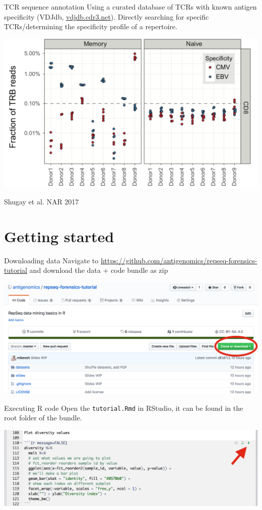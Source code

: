 \documentclass[12pt]{beamer}
\begin{document}
\begin{frame}{TCR sequence annotation}
Using a curated database of TCRs with known antigen specificity (VDJdb, \url{vdjdb.cdr3.net}). Directly searching for specific TCRs/determining the specificity profile of a repertoire.
\begin{center}
\includegraphics[scale=0.35]{p13}
\end{center}
\tiny{Shugay et al. NAR 2017}
\end{frame}

\section{Getting started}

\begin{frame}{Downloading data}
Navigate to \url{https://github.com/antigenomics/repseq-forensics-tutorial} and download the data + code bundle as zip
\begin{center}
\includegraphics[width=\textwidth]{p7}
\end{center}
\end{frame}

\begin{frame}{Executing R code}
Open the \texttt{tutorial.Rmd} in RStudio, it can be found in the root folder of the bundle.
\begin{center}
\includegraphics[width=\textwidth]{p8}
\end{center}
\end{frame}
\end{document}
